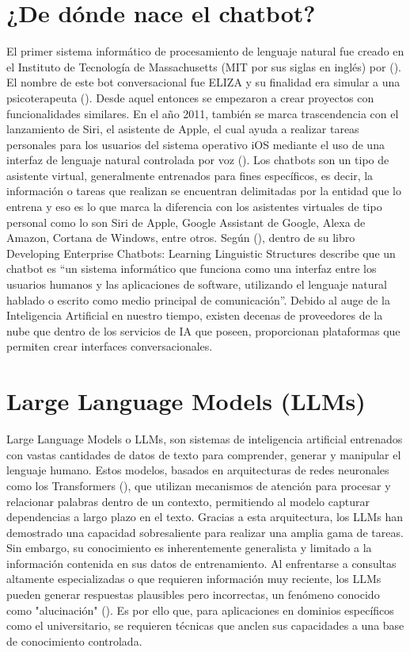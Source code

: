 {{\section{¿De dónde nace el chatbot?}
El primer sistema informático de procesamiento de lenguaje natural fue creado en el Instituto de Tecnología de Massachusetts (MIT por sus siglas en inglés) por (\cite{Weizenbaum1966ELIZA}).  El nombre de este bot conversacional fue ELIZA y su finalidad era simular a una psicoterapeuta (\cite{KhanDas2018}). Desde aquel entonces se empezaron a crear proyectos con funcionalidades similares. En el año 2011, también se marca trascendencia con el lanzamiento de Siri, el asistente de Apple, el cual ayuda a realizar tareas personales para los usuarios del sistema operativo iOS mediante el uso de una interfaz de lenguaje natural controlada por voz (\cite{Reehal2016}). Los chatbots son un tipo de asistente virtual, generalmente entrenados para fines específicos, es decir, la información o tareas que realizan se encuentran delimitadas por la entidad que lo entrena y eso es lo que marca la diferencia con los asistentes virtuales de tipo personal como lo son Siri de Apple, Google Assistant de Google, Alexa de Amazon, Cortana de Windows, entre otros. Según (\cite{Galitsky2019}), dentro de su libro Developing Enterprise Chatbots: Learning Linguistic Structures describe que un chatbot es “un sistema informático que funciona como una interfaz entre los usuarios humanos y las aplicaciones de software, utilizando el lenguaje natural hablado o escrito como medio principal de comunicación”. Debido al auge de la Inteligencia Artificial en nuestro tiempo, existen decenas de proveedores de la nube que dentro de los servicios de IA que poseen, proporcionan plataformas que permiten crear interfaces conversacionales. 


\section{Large Language Models (LLMs)}
Large Language Models o LLMs, son sistemas de inteligencia artificial entrenados con vastas cantidades de datos de texto para comprender, generar y manipular el lenguaje humano. Estos modelos, basados en arquitecturas de redes neuronales como los Transformers (\cite{Rawte2023LLMHallucinationSurvey}), que utilizan mecanismos de atención para procesar y relacionar palabras dentro de un contexto, permitiendo al modelo capturar dependencias a largo plazo en el texto. Gracias a esta arquitectura, los LLMs han demostrado una capacidad sobresaliente para realizar una amplia gama de tareas. Sin embargo, su conocimiento es inherentemente generalista y limitado a la información contenida en sus datos de entrenamiento. Al enfrentarse a consultas altamente especializadas o que requieren información muy reciente, los LLMs pueden generar respuestas plausibles pero incorrectas, un fenómeno conocido como "alucinación" (\cite{Ji2023HallucinationSurvey}). Es por ello que, para aplicaciones en dominios específicos como el universitario, se requieren técnicas que anclen sus capacidades a una base de conocimiento controlada.

}}
